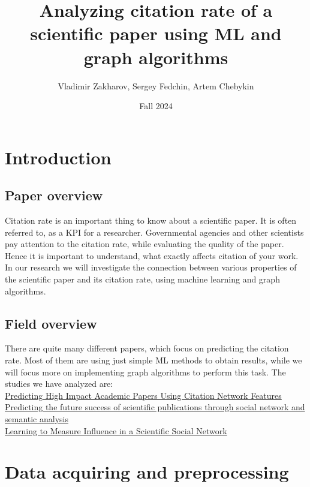 \documentclass{article}
\title{Analyzing citation rate of a scientific paper using ML and graph algorithms}
\author{Vladimir Zakharov, Sergey Fedchin, Artem Chebykin}
\date{Fall 2024}
\newcommand\tab[1][1cm]{\hspace*{#1}}
\begin{document}
\maketitle

\section{Introduction}

\subsection{Paper overview}

\tab Citation rate is an important thing to know about a scientific paper. It is often referred to, as a KPI for a researcher. Governmental agencies and other scientists pay attention to the citation rate, while evaluating the quality of the paper. Hence it is important to understand, what exactly affects citation of your work. In our research we will investigate the connection between various properties of the scientific paper and its citation rate, using machine learning and graph algorithms. \\

\subsection{Field overview}
\tab There are quite many different papers, which focus on predicting the citation rate. Most of them are using just simple ML methods to obtain results, while we will focus more on implementing graph algorithms to perform this task. The studies we have analyzed are: \\

\tab \href{https://link.springer.com/chapter/10.1007/978-3-642-40319-4_2?fromPaywallRec=false}{Predicting High Impact Academic Papers Using Citation Network Features} \\

\tab \href{https://link.springer.com/article/10.1007/s11192-020-03479-5?fromPaywallRec=true}{Predicting the future success of scientific publications through social network and semantic analysis} \\

\tab \href{https://link.springer.com/chapter/10.1007/978-3-319-06483-3_4?fromPaywallRec=true}{Learning to Measure Influence in a Scientific Social Network} \\
\section{Data acquiring and preprocessing}
\end{document}
